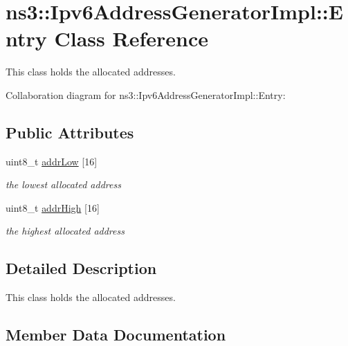 \hypertarget{classns3_1_1Ipv6AddressGeneratorImpl_1_1Entry}{}\section{ns3\+:\+:Ipv6\+Address\+Generator\+Impl\+:\+:Entry Class Reference}
\label{classns3_1_1Ipv6AddressGeneratorImpl_1_1Entry}


This class holds the allocated addresses.  




Collaboration diagram for ns3\+:\+:Ipv6\+Address\+Generator\+Impl\+:\+:Entry\+:
\subsection*{Public Attributes}
\begin{DoxyCompactItemize}
\item 
uint8\+\_\+t \hyperlink{classns3_1_1Ipv6AddressGeneratorImpl_1_1Entry_a4863bb362745edd0ba5f1f09313fad46}{addr\+Low} \mbox{[}16\mbox{]}
\begin{DoxyCompactList}\small\item\em the lowest allocated address \end{DoxyCompactList}\item 
uint8\+\_\+t \hyperlink{classns3_1_1Ipv6AddressGeneratorImpl_1_1Entry_abad0befbd49c75dd39533427921b71bc}{addr\+High} \mbox{[}16\mbox{]}
\begin{DoxyCompactList}\small\item\em the highest allocated address \end{DoxyCompactList}\end{DoxyCompactItemize}


\subsection{Detailed Description}
This class holds the allocated addresses. 

\subsection{Member Data Documentation}
